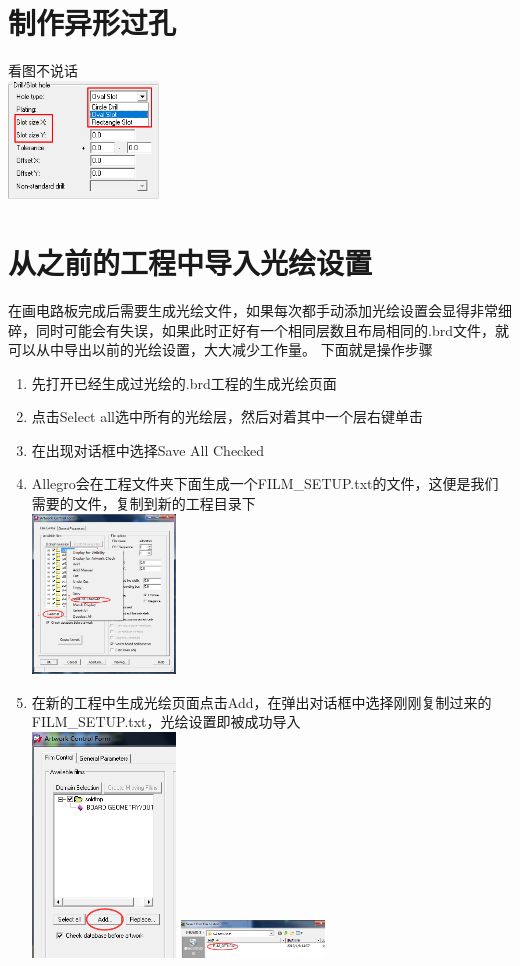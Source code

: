 \documentclass[color=green,mathpazo,titlestyle=hang,11pt]{elegantbook}
\begin{document}
\section{制作异形过孔}
看图不说话\\ \includegraphics[width=0.3\textwidth]{figures/EvenViaSetting.png}

\section{从之前的工程中导入光绘设置}
在画电路板完成后需要生成光绘文件，如果每次都手动添加光绘设置会显得非常细碎，同时可能会有失误，如果此时正好有一个相同层数且布局相同的.brd文件，就可以从中导出以前的光绘设置，大大减少工作量。
下面就是操作步骤
\begin{enumerate}
	\item 先打开已经生成过光绘的.brd工程的生成光绘页面
	\item 点击Select all选中所有的光绘层，然后对着其中一个层右键单击
	\item 在出现对话框中选择Save All Checked
	\item Allegro会在工程文件夹下面生成一个FILM\_SETUP.txt的文件，这便是我们需要的文件，复制到新的工程目录下
	\\ \includegraphics[width=0.3\textwidth]{figures/ArtworkSaveAllCheck.png}
	\item 在新的工程中生成光绘页面点击Add，在弹出对话框中选择刚刚复制过来的FILM\_SETUP.txt，光绘设置即被成功导入
	\\ \includegraphics[width=0.3\textwidth]{figures/ArtworkAdd.png} \includegraphics[width=0.3\textwidth]{figures/ArtworkSelectSetting.png}

\end{enumerate}
\end{document}
